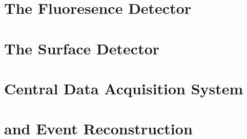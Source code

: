 \section{The Fluoresence Detector}
\label{sec:fd}

\blindtext

\section{The Surface Detector}
\label{sec:sd}

\blindtext

\section{Central Data Acquisition System}
\label{sec:cdas}

\blindtext

\section{\Offline and Event Reconstruction}
\label{sec:rec}

\blindtext
